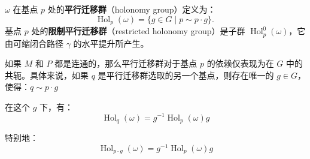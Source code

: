 \(\omega\) 在基点 \(p\) 处的\textbf{平行迁移群}（holonomy group）定义为：
\[
\operatorname{Hol}_p(\omega) = \{g \in G \mid p \sim p \cdot g\}.~
\]
基点 \(p\) 处的\textbf{限制平行迁移群}（restricted holonomy group）是子群 \(\operatorname{Hol}_p^0(\omega)\)，它由可缩闭合路径 \(\gamma\) 的水平提升所产生。

如果 \(M\) 和 \(P\) 都是连通的，那么平行迁移群对于基点 \(p\) 的依赖仅表现为在 \(G\) 中的共轭。具体来说，如果 \(q\) 是平行迁移群选取的另一个基点，则存在唯一的 \(g \in G\)，使得：\(q \sim p \cdot g\)

在这个 \(g\) 下，有：
\[
\operatorname{Hol}_q(\omega) = g^{-1}\operatorname{Hol}_p(\omega)g
\]

特别地：
\[
\operatorname{Hol}_{p \cdot g}(\omega) = g^{-1}\operatorname{Hol}_p(\omega)g
\]